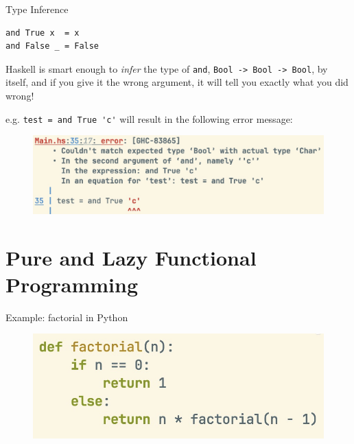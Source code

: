 \documentclass[pdf]{beamer}
\begin{document}
\begin{frame}[fragile]{Type Inference}
\begin{verbatim}
and True x  = x
and False _ = False
\end{verbatim}

  Haskell is smart enough to \textit{infer} the type of \verb|and|, \verb|Bool -> Bool -> Bool|, by itself, and if you give it the wrong argument, it will tell you exactly what you did wrong!

  e.g. \verb|test = and True 'c'| will result in the following error message:
  \begin{figure}[H]
    \centering
    \includegraphics[width=\linewidth]{and-type-error}
  \end{figure}
\end{frame}

\section{Pure and Lazy Functional Programming}
\label{sec:pure-lazy-fp}

\begin{frame}[fragile]{Example: factorial in Python}
  \begin{figure}[H]
    \centering
    \includegraphics[width=\linewidth]{factorial-py}
  \end{figure}
\end{frame}
\end{document}
